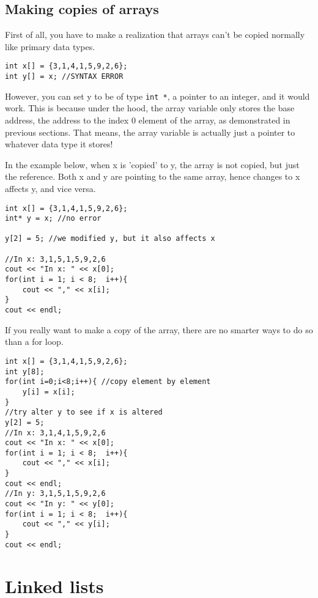 \subsection{Making copies of arrays}

First of all, you have to make a realization that arrays can't be copied normally like primary data types.

\begin{lstlisting}
int x[] = {3,1,4,1,5,9,2,6};
int y[] = x; //SYNTAX ERROR
\end{lstlisting}

However, you can set y to be of type \texttt{int *}, a pointer to an integer, and it would work. This is because under the hood, the array variable only stores the base address, the address to the index 0 element of the array, as demonstrated in previous sections. That means, the array variable is actually just a pointer to whatever data type it stores! 

In the example below, when x is 'copied' to y, the array is not copied, but just the reference. Both x and y are pointing to the same array, hence changes to x affects y, and vice versa. 

\begin{lstlisting}
int x[] = {3,1,4,1,5,9,2,6};
int* y = x; //no error

y[2] = 5; //we modified y, but it also affects x

//In x: 3,1,5,1,5,9,2,6 
cout << "In x: " << x[0];
for(int i = 1; i < 8;  i++){
    cout << "," << x[i];
}
cout << endl;
\end{lstlisting}

If you really want to make a copy of the array, there are no smarter ways to do so than a for loop.

\begin{lstlisting}
int x[] = {3,1,4,1,5,9,2,6};
int y[8];
for(int i=0;i<8;i++){ //copy element by element
    y[i] = x[i];
}
//try alter y to see if x is altered
y[2] = 5;
//In x: 3,1,4,1,5,9,2,6
cout << "In x: " << x[0];
for(int i = 1; i < 8;  i++){
    cout << "," << x[i];
}
cout << endl;
//In y: 3,1,5,1,5,9,2,6
cout << "In y: " << y[0];
for(int i = 1; i < 8;  i++){
    cout << "," << y[i];
}
cout << endl;
\end{lstlisting}

\section{Linked lists}

